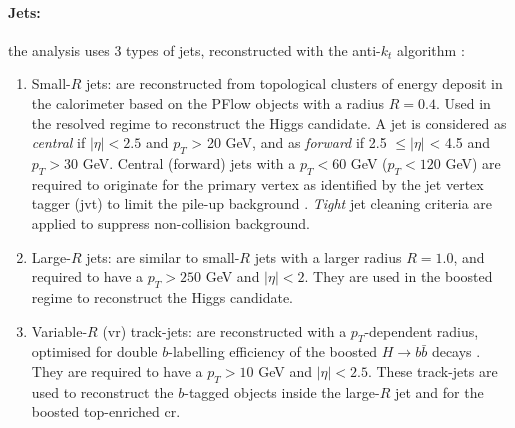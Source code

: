\paragraph{Jets:} the analysis uses 3 types of jets, reconstructed with the anti-$k_t$ algorithm \cite{Cacciari:2008gp}:
\begin{enumerate}
  \item Small-$R$ jets: are reconstructed from topological clusters of energy deposit in the calorimeter based on the PFlow objects with a radius $R = 0.4$. Used in the resolved regime to reconstruct the Higgs candidate. A jet is considered as \textit{central} if $|\eta| < 2.5$ and $p_T$ > 20 GeV, and as \textit{forward} if 2.5 $\leq |\eta|$ < 4.5 and $p_T > 30$ GeV. Central (forward) jets with a $p_T < 60$ GeV ($p_T < 120$ GeV) are required to originate for the primary vertex as identified by the jet vertex tagger (\gls{jvt}) to limit the pile-up background \cite{atlasPUJVT}. \textit{Tight} jet cleaning criteria are applied to suppress non-collision background. %
  \item Large-$R$ jets: are similar to small-$R$ jets with a larger radius $R = 1.0$, and required to have a $p_T > 250$ GeV and $|\eta| < 2$. They are used in the boosted regime to reconstruct the Higgs candidate. 
  \item Variable-$R$ (\gls{vr}) track-jets: are reconstructed with a $p_T$-dependent radius, optimised for double $b$-labelling efficiency of the boosted $H \rightarrow b\bar{b}$ decays \cite{ATL-PHYS-PUB-2017-010}. They are required to have a $p_T > 10$ GeV and $|\eta| < 2.5$. These track-jets are used to reconstruct the $b$-tagged objects inside the large-$R$ jet and for the boosted top-enriched \gls{cr}. 
\end{enumerate}

